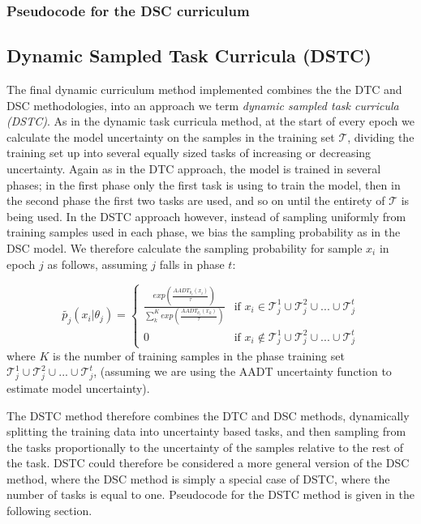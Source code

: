 \subsubsection{Pseudocode for the DSC curriculum}\label{sec:DSCPseudocode}

\subsection{Dynamic Sampled Task Curricula (DSTC)}
The final dynamic curriculum method implemented combines the the DTC and DSC methodologies, into an approach we term \textit{dynamic sampled task curricula (DSTC)}. As in the dynamic task curricula method, at the start of every epoch we calculate the model uncertainty on the samples in the training set  $\mathcal{T}$, dividing the training set up into several equally sized tasks of increasing or decreasing uncertainty. Again as in the DTC approach, the model is trained in several phases; in the first phase only the first task is using to train the model, then in the second phase the first two tasks are used, and so on until the entirety of $\mathcal{T}$ is being used. In the DSTC approach however, instead of sampling uniformly from training samples used in each phase, we bias the sampling probability as in the DSC model. We therefore calculate the sampling probability for sample $x_i$ in epoch $j$ as follows, assuming $j$ falls in phase $t$:

\begin{equation}\label{eq:DSC_Prob}
\tilde{p_j}(x_i | \theta_j) = 
\begin{cases} 
\frac{exp(\frac{AADT_{\theta_j}(x_i)}{\tau})}{\sum_{k}^{K} exp(\frac{AADT_{\theta_j}(x_k)}{\tau})} & \text{if } x_i \in \mathcal{T}_j^1 \cup \mathcal{T}_j^2 \cup ... \cup \mathcal{T}_j^t \\
0 & \text{if } x_i  \notin \mathcal{T}_j^1 \cup \mathcal{T}_j^2 \cup ... \cup \mathcal{T}_j^t
\end{cases}
\end{equation}
where $K$ is the number of training samples in the phase training set $\mathcal{T}_j^1 \cup \mathcal{T}_j^2 \cup ... \cup \mathcal{T}_j^t$, (assuming we are using the AADT uncertainty function to estimate model uncertainty).

The DSTC method therefore combines the DTC and DSC methods, dynamically splitting the training data into uncertainty based tasks, and then sampling from the tasks proportionally to the uncertainty of the samples relative to the rest of the task. DSTC could therefore be considered a more general version of the DSC method, where the DSC method is simply a special case of DSTC, where the number of tasks is equal to one. Pseudocode for the DSTC method is given in the following section.

